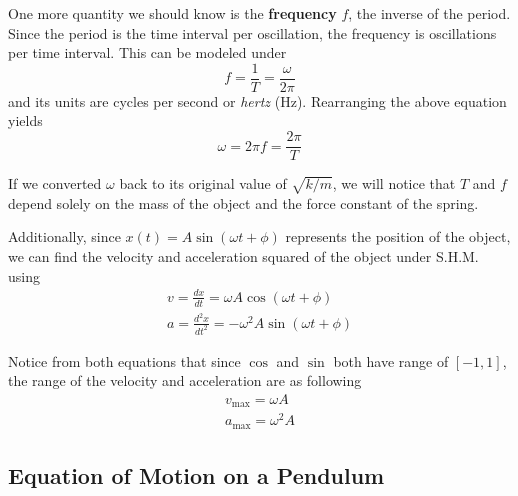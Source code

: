 One more quantity we should know is the \textbf{frequency} $f$, the inverse of the period.
Since the period is the time interval per oscillation, the frequency is oscillations per time interval.
This can be modeled under
\begin{equation}\label{15.11}
    f = \frac{1}{T} = \frac{\omega}{2\pi}
\end{equation}
and its units are cycles per second or \textit{hertz} (Hz). Rearranging the above equation yields
\begin{equation}\label{15.12}
    \omega = 2\pi f = \frac{2\pi}{T}
\end{equation}

If we converted $\omega$ back to its original value of $\sqrt{k/m}$, we will notice that $T$ and $f$
depend solely on the mass of the object and the force constant of the spring.

Additionally, since $x(t) = A\sin(\omega t + \phi)$ represents the position of the object, we can
find the velocity and acceleration squared of the object under S.H.M. using
\begin{eqnarray}
    v = \frac{dx}{dt} = \omega A\cos(\omega t + \phi)\\
    a = \frac{d^2x}{dt^2} = -\omega^2 A\sin(\omega t + \phi)
\end{eqnarray}

Notice from both equations that since $\cos$ and $\sin$ both have range of $[-1, 1]$, the range of 
the velocity and acceleration are as following
\begin{eqnarray}
    v_{\max} = \omega A\\
    a_{\max} = \omega^2 A
\end{eqnarray}

\subsection{Equation of Motion on a Pendulum}

